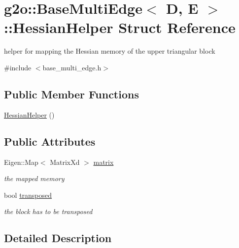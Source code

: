 \hypertarget{structg2o_1_1_base_multi_edge_1_1_hessian_helper}{}\section{g2o\+:\+:Base\+Multi\+Edge$<$ D, E $>$\+:\+:Hessian\+Helper Struct Reference}
\label{structg2o_1_1_base_multi_edge_1_1_hessian_helper}


helper for mapping the Hessian memory of the upper triangular block  




{\ttfamily \#include $<$base\+\_\+multi\+\_\+edge.\+h$>$}

\subsection*{Public Member Functions}
\begin{DoxyCompactItemize}
\item 
\mbox{\hyperlink{structg2o_1_1_base_multi_edge_1_1_hessian_helper_a5a76a58b21ca39ea6ca1e274b588fad0}{Hessian\+Helper}} ()
\end{DoxyCompactItemize}
\subsection*{Public Attributes}
\begin{DoxyCompactItemize}
\item 
Eigen\+::\+Map$<$ Matrix\+Xd $>$ \mbox{\hyperlink{structg2o_1_1_base_multi_edge_1_1_hessian_helper_ab9eab8a9c5bf6e7814173d1955d7a01c}{matrix}}
\begin{DoxyCompactList}\small\item\em the mapped memory \end{DoxyCompactList}\item 
bool \mbox{\hyperlink{structg2o_1_1_base_multi_edge_1_1_hessian_helper_aeaff0227a982c30364d97ef9f0d9d60c}{transposed}}
\begin{DoxyCompactList}\small\item\em the block has to be transposed \end{DoxyCompactList}\end{DoxyCompactItemize}


\subsection{Detailed Description}
